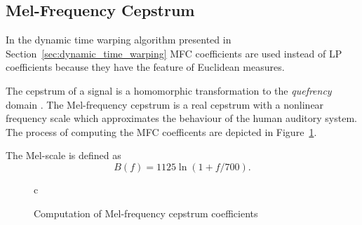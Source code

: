 \subsection{Mel-Frequency Cepstrum} %
\label{sub:mel_frequency_cepstrum}
In the dynamic time warping algorithm presented in Section~\ref{sec:dynamic_time_warping} MFC coefficients are used instead of LP coefficients because they have the feature of Euclidean measures.

The cepstrum of a signal is a homomorphic transformation to the \emph{quefrency} domain \cite{taletek}. The Mel-frequency cepstrum is a real cepstrum with a nonlinear frequency scale which approximates the behaviour of the human auditory system. The process of computing the MFC coefficents are depicted in Figure~\ref{fig:mfcc}.

The Mel-scale is defined as \cite{taletek}
\begin{equation}
	B(f) = 1125\ln(1+f/700).
\end{equation}
 \begin{figure}[htbp]
  \centering
  \begin{tabular}[h]{c}
  \end{tabular}
  \caption{Computation of Mel-frequency cepstrum coefficients}
  \label{fig:mfcc}
\end{figure}

